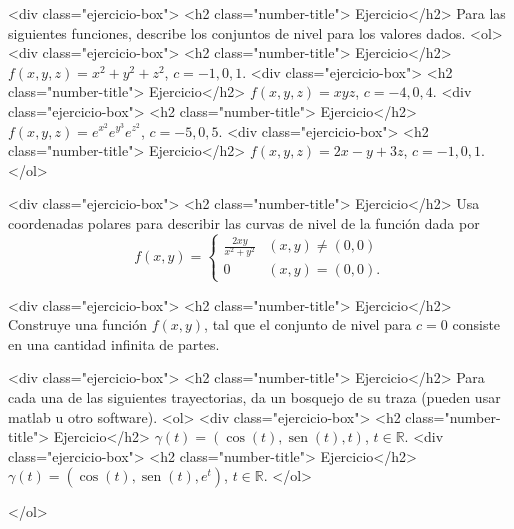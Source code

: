 \documentclass{article}
\theoremstyle{definition}
\newcommand{\sen}{\operatorname{sen}}
\begin{document}
	<div class="ejercicio-box"> <h2 class="number-title"> Ejercicio</h2> Para las siguientes funciones, describe los conjuntos de nivel para los valores dados.
	<ol>
	<div class="ejercicio-box"> <h2 class="number-title"> Ejercicio</h2> $f(x,y,z)=x^2+y^2+z^2$, $c=-1,0,1$.
	<div class="ejercicio-box"> <h2 class="number-title"> Ejercicio</h2> $f(x,y,z)=xyz$, $c=-4,0,4$.
	<div class="ejercicio-box"> <h2 class="number-title"> Ejercicio</h2> $f(x,y,z)=e^{x^2}e^{y^3}e^{z^2}$, $c=-5,0,5$.
	<div class="ejercicio-box"> <h2 class="number-title"> Ejercicio</h2> $f(x,y,z)=2x-y+3z$, $c=-1,0,1$.
	</ol>
	
	
	<div class="ejercicio-box"> <h2 class="number-title"> Ejercicio</h2> Usa coordenadas polares para describir las curvas de nivel de la función dada por
	$$
	f(x,y)=\left\{
	\begin{array}{cc}
	\frac{2xy}{x^2+y^2} & (x,y)\ne (0,0)\\
	0 & (x,y)=(0,0).
	\end{array}
	\right.
	$$
	
	
	<div class="ejercicio-box"> <h2 class="number-title"> Ejercicio</h2> Construye una función $f(x,y)$, tal que el conjunto de nivel para $c=0$ consiste en una cantidad infinita
	de partes.
	
	<div class="ejercicio-box"> <h2 class="number-title"> Ejercicio</h2> Para cada una de las siguientes trayectorias, da un bosquejo de su traza (pueden usar matlab u otro software).
	<ol>
	<div class="ejercicio-box"> <h2 class="number-title"> Ejercicio</h2> $\gamma(t)=(\cos(t), \sen(t), t)$, $t\in \mathbb{R}$.
	<div class="ejercicio-box"> <h2 class="number-title"> Ejercicio</h2> $\gamma(t)=(\cos(t), \sen(t), e^t)$, $t\in \mathbb{R}$.
	</ol>
	


</ol>
  
       
\end{document}
